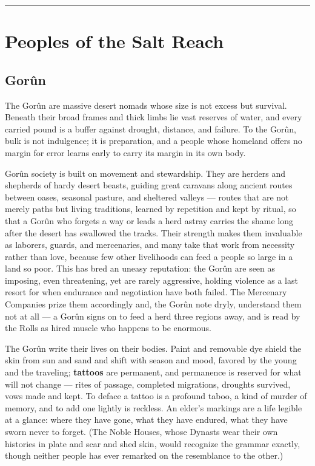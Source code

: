 \bigskip
\hrule
\bigskip

\section{Peoples of the Salt Reach}

\subsection{Gorûn}

The Gorûn are massive desert nomads whose size is not excess but survival. Beneath their broad frames and thick limbs lie vast reserves of water, and every carried pound is a buffer against drought, distance, and failure. To the Gorûn, bulk is not indulgence; it is preparation, and a people whose homeland offers no margin for error learns early to carry its margin in its own body.

Gorûn society is built on movement and stewardship. They are herders and shepherds of hardy desert beasts, guiding great caravans along ancient routes between oases, seasonal pasture, and sheltered valleys --- routes that are not merely paths but living traditions, learned by repetition and kept by ritual, so that a Gorûn who forgets a way or leads a herd astray carries the shame long after the desert has swallowed the tracks. Their strength makes them invaluable as laborers, guards, and mercenaries, and many take that work from necessity rather than love, because few other livelihoods can feed a people so large in a land so poor. This has bred an uneasy reputation: the Gorûn are seen as imposing, even threatening, yet are rarely aggressive, holding violence as a last resort for when endurance and negotiation have both failed. The Mercenary Companies prize them accordingly and, the Gorûn note dryly, understand them not at all --- a Gorûn signs on to feed a herd three regions away, and is read by the Rolls as hired muscle who happens to be enormous.

The Gorûn write their lives on their bodies. Paint and removable dye shield the skin from sun and sand and shift with season and mood, favored by the young and the traveling; \textbf{tattoos} are permanent, and permanence is reserved for what will not change --- rites of passage, completed migrations, droughts survived, vows made and kept. To deface a tattoo is a profound taboo, a kind of murder of memory, and to add one lightly is reckless. An elder's markings are a life legible at a glance: where they have gone, what they have endured, what they have sworn never to forget. (The Noble Houses, whose Dynasts wear their own histories in plate and scar and shed skin, would recognize the grammar exactly, though neither people has ever remarked on the resemblance to the other.)

